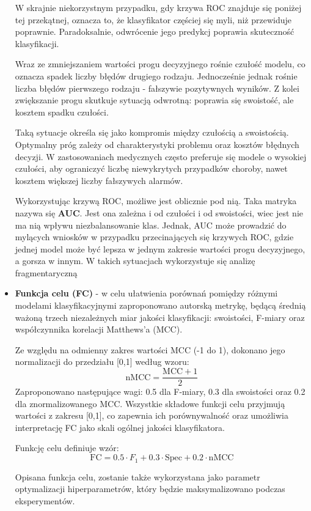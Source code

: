 \documentclass[a4paper,twoside,12pt]{book}
\begin{document}
\begin{itemize}
	      W skrajnie niekorzystnym przypadku, gdy krzywa ROC znajduje się poniżej tej przekątnej, oznacza to, że klasyfikator częściej się myli, niż przewiduje poprawnie. Paradoksalnie, odwrócenie jego predykcj poprawia skuteczność klasyfikacji.

	      Wraz ze zmniejszaniem wartości progu decyzyjnego rośnie czułość modelu, co oznacza spadek liczby błędów drugiego rodzaju. Jednocześnie jednak rośnie liczba błędów pierwszego rodzaju - fałszywie pozytywnych wyników. Z kolei zwiększanie progu skutkuje sytuacją odwrotną: poprawia się swoistość, ale kosztem spadku czułości.

	      Taką sytuacje określa się jako kompromis między czułością a swoistością. Optymalny próg zależy od charakterystyki problemu oraz kosztów błędnych decyzji. W zastosowaniach medycznych często preferuje się modele o wysokiej czułości, aby ograniczyć liczbę niewykrytych przypadków choroby, nawet kosztem większej liczby fałszywych alarmów.

	      Wykorzystując krzywą ROC, możliwe jest oblicznie pod nią. Taka matryka nazywa się \textbf{AUC}. Jest ona zależna i od czułości i od swoistości, wiec jest nie ma nią wpływu niezbalansowanie klas. Jednak,  AUC może prowadzić do mylących wniosków w przypadku przecinających się krzywych ROC, gdzie jednej model może być lepsza w jednym zakresie wartości progu decyzyjnego, a gorsza w innym. W takich sytuacjach wykorzystuje się analizę fragmentaryczną\cite{mcclish1989roc}


	\item \textbf{Funkcja celu (FC)} - w celu ułatwienia porównań pomiędzy różnymi modelami klasyfikacyjnymi zaproponowano autorską metrykę, będącą średnią ważoną trzech niezależnych miar jakości klasyfikacji: swoistości, F-miary oraz współczynnika korelacji Matthews'a (MCC).

	      Ze względu na odmienny zakres wartości MCC (\mbox{-1} do 1), dokonano jego normalizacji do przedziału [0,1] według wzoru:
	      \begin{equation}
		      \text{nMCC} = \frac{\text{MCC} + 1}{2}
	      \end{equation}
	      Zaproponowano następujące wagi: 0.5 dla F-miary, 0.3 dla swoistości oraz 0.2 dla znormalizowanego MCC. Wszystkie składowe funkcji celu przyjmują wartości z zakresu [0,1], co zapewnia ich porównywalność oraz umożliwia interpretację FC jako skali ogólnej jakości klasyfikatora.

	      Funkcję celu definiuje wzór:
	      \begin{equation}
		      \text{FC} = 0.5 \cdot F_1 + 0.3 \cdot \text{Spec} +  0.2 \cdot \text{nMCC}
	      \end{equation}

	      Opisana funkcja celu, zostanie także wykorzystana jako parametr optymalizacji hiperparametrów, który będzie maksymalizowano podczas eksperymentów.

\end{itemize}
\end{document}
